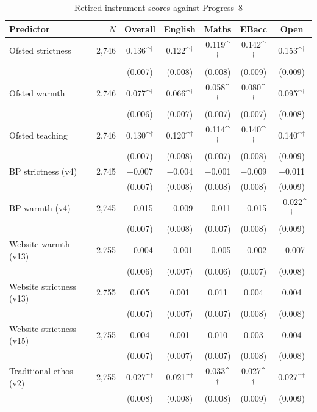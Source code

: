 \begin{table}[htbp]\centering
\caption{Retired-instrument scores against Progress~8}
\label{tab:llm_p8_matrix}
\def\sym#1{\ifmmode^{#1}\else\(^{#1}\)\fi}

\footnotesize\setlength{\tabcolsep}{4pt}
\begin{tabular}{lrccccc}
\toprule
Predictor & $N$ & Overall & English & Maths & EBacc & Open \\
\midrule
Ofsted strictness & 2{,}746 & 0.136\sym{\dagger} & 0.122\sym{\dagger} & 0.119\sym{\dagger} & 0.142\sym{\dagger} & 0.153\sym{\dagger} \\
 & & (0.007) & (0.008) & (0.008) & (0.009) & (0.009) \\
Ofsted warmth & 2{,}746 & 0.077\sym{\dagger} & 0.066\sym{\dagger} & 0.058\sym{\dagger} & 0.080\sym{\dagger} & 0.095\sym{\dagger} \\
 & & (0.006) & (0.007) & (0.007) & (0.007) & (0.008) \\
Ofsted teaching & 2{,}746 & 0.130\sym{\dagger} & 0.120\sym{\dagger} & 0.114\sym{\dagger} & 0.140\sym{\dagger} & 0.140\sym{\dagger} \\
 & & (0.007) & (0.008) & (0.007) & (0.008) & (0.009) \\
BP strictness (v4) & 2{,}745 & $-$0.007 & $-$0.004 & $-$0.001 & $-$0.009 & $-$0.011 \\
 & & (0.007) & (0.008) & (0.008) & (0.008) & (0.009) \\
BP warmth (v4) & 2{,}745 & $-$0.015 & $-$0.009 & $-$0.011 & $-$0.015 & $-$0.022\sym{\dagger} \\
 & & (0.007) & (0.008) & (0.007) & (0.008) & (0.009) \\
Website warmth (v13) & 2{,}755 & $-$0.004 & $-$0.001 & $-$0.005 & $-$0.002 & $-$0.007 \\
 & & (0.006) & (0.007) & (0.006) & (0.007) & (0.008) \\
Website strictness (v13) & 2{,}755 & 0.005 & 0.001 & 0.011 & 0.004 & 0.004 \\
 & & (0.007) & (0.007) & (0.007) & (0.008) & (0.008) \\
Website strictness (v15) & 2{,}755 & 0.004 & 0.001 & 0.010 & 0.003 & 0.004 \\
 & & (0.007) & (0.007) & (0.007) & (0.008) & (0.008) \\
Traditional ethos (v2) & 2{,}755 & 0.027\sym{\dagger} & 0.021\sym{\dagger} & 0.033\sym{\dagger} & 0.027\sym{\dagger} & 0.027\sym{\dagger} \\
 & & (0.008) & (0.008) & (0.008) & (0.009) & (0.009) \\

\end{tabular}
\end{table}

